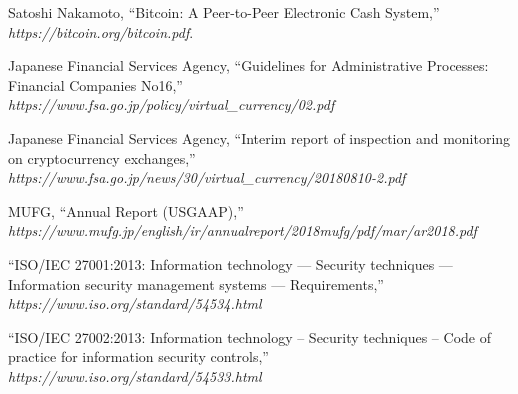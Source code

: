 \documentclass[english]{llncs}
\begin{document}
\begin{thebibliography}{21}
 Satoshi Nakamoto, ``Bitcoin: A Peer-to-Peer Electronic Cash System,'' \textit{https://bitcoin.org/bitcoin.pdf}.



Japanese Financial Services Agency, ``Guidelines for Administrative Processes: Financial Companies No16,''
\textit{https://www.fsa.go.jp/policy/virtual\_currency/02.pdf}

Japanese Financial Services Agency, ``Interim report of inspection and monitoring on cryptocurrency exchanges,''
\textit{https://www.fsa.go.jp/news/30/virtual\_currency/20180810-2.pdf}

MUFG, ``Annual Report (USGAAP),''\\
\textit{https://www.mufg.jp/english/ir/annualreport/2018mufg/pdf/mar/ar2018.pdf}

``ISO/IEC 27001:2013: Information technology — Security techniques — Information security management systems — Requirements,''  \\
\textit{https://www.iso.org/standard/54534.html}

``ISO/IEC 27002:2013: Information technology -- Security techniques -- Code of practice for information security controls,''  \\
\textit{https://www.iso.org/standard/54533.html}

\end{thebibliography}

%
%
%
\end{document}

